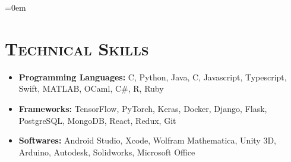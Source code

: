 \documentclass{article}
\makeatletter
\newenvironment{longversion}{}{} %
\newcommand{\headerrow}[2]
{\begin{tabular*}{\linewidth}{l@{\extracolsep{\fill}}r}
	#1 &
	#2 \\
\end{tabular*}}
\newcommand{\CPP}
{C\nolinebreak[4]\hspace{-.05em}\raisebox{.22ex}{\footnotesize\bf ++}}
\newcommand{\tmpsection}[1]{}
\let\tmpsection=\section
\renewcommand{\section}[1]{\tmpsection*{\textsc{#1}}}
\makeatother
\begin{document}
\begin{longversion}
\begin{list} {}{\leftmargin=0em}


\end{list}


\begin{longversion}
\section{Technical Skills}\begin{itemize}

\item \textbf{Programming Languages:}  \CPP, Python, Java, C, Javascript, Typescript, Swift, MATLAB, OCaml, C\#, R, Ruby
\item \textbf{Frameworks:} TensorFlow, PyTorch, Keras, Docker, Django, Flask, PostgreSQL, MongoDB, React, Redux, Git

\item \textbf{Softwares:} Android Studio, Xcode, Wolfram Mathematica, Unity 3D, Arduino, Autodesk, Solidworks, Microsoft Office

\end{itemize}

\end{longversion}

\end{longversion}
\end{document}
